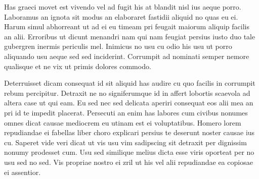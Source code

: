 Has graeci movet est vivendo vel ad fugit his at blandit nisl ius aeque porro. Laboramus an ignota sit modus an elaboraret fastidii aliquid no quas eu ei. Harum simul abhorreant ut ad ei eu timeam pri feugait maiorum aliquip facilis an alii. Erroribus ut dicunt menandri nam qui nam feugiat persius iusto duo tale gubergren inermis periculis mel. Inimicus no usu cu odio his usu ut porro aliquando usu aeque sed sed inciderint. Corrumpit ad nominati semper nemore qualisque et ne vix ut primis dolores commodo.

Deterruisset dicam consequat id sit aliquid has audire cu quo facilis in corrumpit rebum percipitur. Detraxit ne no signiferumque id in affert lobortis scaevola ad altera case ut qui eam. Eu sed nec sed delicata aperiri consequat eos alii mea an pri id te impedit placerat. Persecuti an enim has labores cum civibus nonumes omnes dicat causae mediocrem eu utinam est ei voluptatibus. Homero lorem repudiandae ei fabellas liber choro explicari persius te deserunt noster causae ius cu. Saperet vide veri dicat ut vis usu vim sadipscing sit detraxit per dignissim nonumy prodesset cum. Usu sed similique melius dicta esse viris oporteat per no usu sed no sed. Vis propriae nostro ei zril ut his vel alii repudiandae ea copiosae ei assentior.